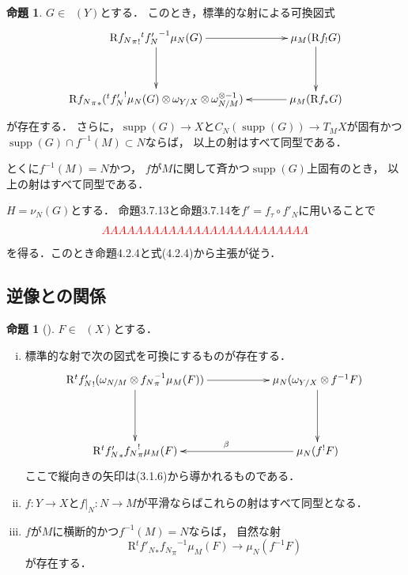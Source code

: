 \documentclass[uplatex,dvipdfmx,a4paper,10pt,draft]{jsarticle}
\makeatletter
\theoremstyle{definition}
\renewenvironment{proof}[1][\proofname]{\par
  \pushQED{\qed}%
  \normalfont \topsep6\p@\@plus6\p@\relax
  \trivlist
  \item[\hskip\labelsep
         \bfseries
    {#1}]\ignorespaces
}{%
  \popQED\endtrivlist\@endpefalse
}
\renewcommand{\proofname}{証明.}
\numberwithin{equation}{section}
\newcommand{\supp}{\mathop{\mathrm{supp}}\nolimits}
\newcommand{\Dompb}{\mathop{\mathsf{D}^\mathrm{b}}\nolimits}
\newcommand{\Rder}{\mathrm{R}}
\newcommand{\tens}[1][]{\mathbin{\otimes_{\raise1.5ex\hbox to-.1em{}{#1}}}}
\newcommand{\mres}[2][]{{\left.{#1}\right\rvert}_{#2}}
\theoremstyle{mystyle}
\newtheorem{myprp}[mythm]{命題}
\newenvironment{prp}{\begin{prpbox}\begin{myprp}}{\end{myprp}\end{prpbox}}
\makeatother
\begin{document}
\begin{prp}
    \(G\in\Dompb(Y)\)とする．
    このとき，標準的な射による可換図式    
    \[    
        \vcenter{\xymatrix@C=36pt@R=36pt{
        \Rder{{f_{N}}_{\pi}}_{!}{{}^t{f'_{N}}^{-1}}\mu_{N}(G)
        \ar[d]
        \ar[r]
        &
        \mu_{M}(\Rder{f_{!}}G)
        \ar[d]
        \\
        \Rder{{f_{N}}_{\pi}}_{\ast}({{}^t{f'_{N}}^{!}}\mu_{N}(G)\tens[]\omega_{Y/X}\tens[]\omega_{N/M}^{\otimes{-1}})
        &
        \mu_{M}(\Rder{f_{\ast}}G)
        \ar[l]
        }}
    \]が存在する．
    さらに，\(\supp(G)\to X\)と\(
        C_N(\supp(G))\to T_{M}X
    \)が固有かつ\(\supp(G)\cap f^{-1}(M)\subset N\)ならば，
    以上の射はすべて同型である．
    
    とくに\(f^{-1}(M)=N\)かつ，
    \(f\)が\(M\)に関して斉かつ\(\supp(G)\)上固有のとき，
    以上の射はすべて同型である．
\end{prp}

\begin{proof}
    \(H=\nu_{N}(G)\)とする．
    命題3.7.13と命題3.7.14を\(f'=f_{\tau}\circ f'_{N}\)に用いることで
    \begin{align*}
        \textcolor{red}{AAAAAAAAAAAAAAAAAAAAAAAAA}
    \end{align*}
    を得る．このとき命題4.2.4と式(4.2.4)から主張が従う．
\end{proof}

\subsection*{逆像との関係}


\begin{prp}[{\cite[Prop.4.3.5]{KS90}}]
    \(F\in\Dompb(X)\)とする．
    \begin{enumerate}[(i)]
        \item 標準的な射で次の図式を可換にするものが存在する．
        \[\vcenter{\xymatrix@C=56pt@R=46pt{
            \Rder{{}^{t}{f'_{N}}_{!}}(\omega_{N/M}\tens[]{{f_{N}}_{\pi}^{-1}}\mu_{M}(F))
            \ar[d]^{}
            \ar[r]_{}
            &
            \mu_{N}(\omega_{Y/X}\tens[]{f^{-1}}F)
            \ar[d]
            \\
            \Rder{{}^{t}{f'_{N}}_{\ast}}{{f_{N}}^{!}_{\pi}}\mu_{M}(F)
            &
            \mu_{N}({f^{!}}F)
            \ar[l]_{\beta}
        }}\]
        ここで縦向きの矢印は(3.1.6)から導かれるものである．
        \item \(f\colon Y\to X\)と\(\mres[f]{N}\colon N\to M\)が平滑ならばこれらの射はすべて同型となる．    
        \item \(f\)が\(M\)に横断的かつ\(f^{-1}(M)=N\)ならば，
        自然な射\[
            \Rder{{}^{t}{f'_{N}}_{\ast}}{{f_{N}}_{\pi}}^{-1}\mu_{M}(F)
            \to \mu_{N}(f^{-1}F)
        \]が存在する．
    \end{enumerate}
\end{prp}
\end{document}
